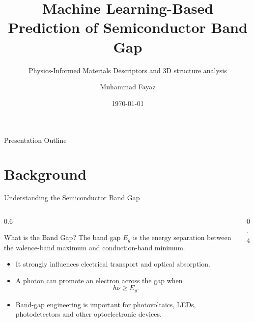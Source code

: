 \documentclass[aspectratio=169,11pt]{beamer}
\title[ML Prediction of Band Gap]{Machine Learning-Based Prediction of Semiconductor Band Gap}
\subtitle{Physics-Informed Materials Descriptors and 3D structure analysis}
\author{Muhammad Fayaz}
\institute{Department of Physics \\
(uop)}
\date{\today}
\begin{document}
\begin{frame}
  \titlepage
\end{frame}

\begin{frame}{Presentation Outline}
\tableofcontents
\end{frame}

\section{Background}

\begin{frame}{Understanding the Semiconductor Band Gap}
	
	\begin{columns}[T]
		
		\begin{column}{0.6\textwidth}
			
			\begin{block}{What is the Band Gap?}
				The band gap $E_g$ is the energy separation between
				the valence-band maximum and conduction-band minimum.
			\end{block}
			
			
			\begin{itemize}
				\item It strongly influences electrical transport
				and optical absorption.
				\item A photon can promote an electron across the
				gap when
				\[
				h\nu \geq E_g.
				\]
				\item Band-gap engineering is important for
				photovoltaics, LEDs, photodetectors and
				other optoelectronic devices.
			\end{itemize}
			
			
		
			
		\end{column}
		
		
		\begin{column}{0.4\textwidth}
			
			\begin{center}
				

\end{center}
\end{column}
\end{columns}
\end{frame}
\end{document}
